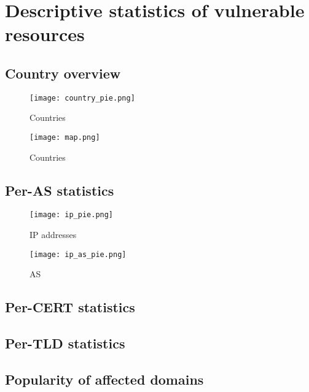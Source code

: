 \section{Descriptive statistics of vulnerable resources}
\subsection{Country overview}
\begin{figure}[!hbt]
\centering
\texttt{[image: country\_pie.png]}
\caption{Countries}
\end{figure}

\begin{figure}[!hbt]
\centering
\texttt{[image: map.png]}
\caption{Countries}
\end{figure}

\subsection{Per-AS statistics}
\begin{figure}[!hbt]
\centering
\texttt{[image: ip\_pie.png]}
\caption{IP addresses}
\end{figure}

\begin{figure}[!hbt]
\centering
\texttt{[image: ip\_as\_pie.png]}
\caption{AS}
\end{figure}

\subsection{Per-CERT statistics}
\subsection{Per-TLD statistics}
\subsection{Popularity of affected domains}

